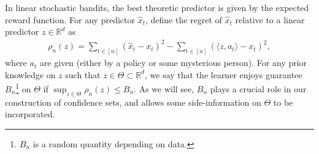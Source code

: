 \documentclass[letterpaper,11pt,openright,openany]{book}
\numberwithin{equation}{section}
\theoremstyle{plain}
\theoremstyle{definition}
\def\R{{\mathbb R}}
\def\R{{\mathbb R}}
\begin{document}
In linear stochastic bandits, the best theoretic predictor is given by the expected reward function. For any predictor $\hat{x}_t$, define the regret of $\hat{x}_t$ relative to a linear predictor $z\in\R^d$ as
\begin{align*}
\rho_n(z) = \sum_{t\in [n]}(\hat{x}_t-x_t)^2-\sum_{t\in [n]}(\langle z, a_t\rangle-x_t)^2,
\end{align*}
where $a_t$ are given (either by a policy or some mysterious person). For any prior knowledge on $z$ such that $z\in\Theta\subset\R^d$, we say that the learner enjoys guarantee $B_n$\footnote{$B_n$ is a random quantity depending on data.} on $\Theta$ if $\sup_{z\in\Theta}\rho_n(z)\leq B_n$. As we will see, $B_n$ plays a crucial role in our construction of confidence sets, and allows some side-information on $\Theta$ to be incorporated.  
\end{document}
